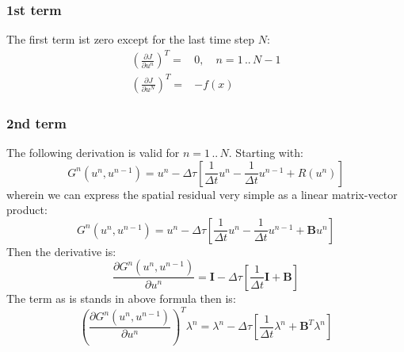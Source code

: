 \documentclass[10pt]{article}
\begin{document}
\subsubsection*{1st term}
The first term ist zero except for the last time step $N$:
\begin{align}
\left( \frac{\partial J}{\partial u^n} \right)^T =& 0,\quad n = 1\,..\,N-1 \\
\left( \frac{\partial J}{\partial u^N} \right)^T =& -f(x) 
\end{align}
\subsubsection*{2nd term}
The following derivation is valid for $n = 1\,..\,N$. Starting with:
\begin{equation}
G^n\left( u^n,u^{n-1} \right) = u^n - \Delta\tau\left[ \frac{1}{\Delta t} u^{n} - \frac{1}{\Delta t} u^{n-1} + R \left( u^n \right) \right]
\end{equation}
wherein we can express the spatial residual very simple as a linear matrix-vector product:
\begin{equation}
G^n\left( u^n,u^{n-1} \right) = u^n - \Delta\tau\left[ \frac{1}{\Delta t} u^{n} - \frac{1}{\Delta t} u^{n-1} + \mathbf{B}u^n  \right]
\end{equation}
Then the derivative is:
\begin{equation}
\frac{\partial G^n\left( u^n,u^{n-1} \right)}{\partial u^n} = \mathbf{I} - \Delta\tau\left[ \frac{1}{\Delta t} \mathbf{I} + \mathbf{B} \right]
\end{equation}
The term as is stands in above formula then is:
\begin{equation}
\left( \frac{\partial G^n\left( u^n,u^{n-1} \right)}{\partial u^n} \right)^T \lambda^n = \lambda^n - \Delta\tau\left[ \frac{1}{\Delta t} \lambda^n + \mathbf{B}^T \lambda^n \right]
\end{equation}
\end{document}
